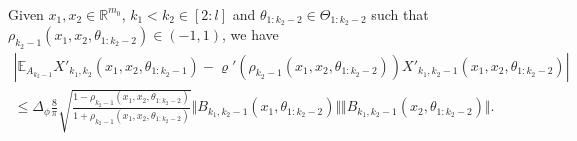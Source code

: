 \documentclass[twoside,11pt]{article}
\newcommand{\R}{\mathbb{R}}
\newcommand{\E}{\mathbb{E}}
\begin{document}
\begin{proposition}\label{prop:bwd_expectation_offdiagonal}~\\
Given $x_1,x_2 \in \R^{m_0}$, $k_1 < k_2 \in [2:l]$ and $\theta_{1:k_2-2} \in \Theta_{1:k_2-2}$ such that $\rho_{k_2-1}(x_1,x_2,\theta_{1:k_2-2}) \in (-1,1)$, we have
\begin{multline*}
\left\vert \E_{A_{k_2-1}} X'_{k_1,k_2}(x_1,x_2,\theta_{1:k_2-1}) - \varrho'(\rho_{k_2-1}(x_1,x_2,\theta_{1:k_2-2})) X'_{k_1,k_2-1}(x_1,x_2,\theta_{1:k_2-2}) \right\vert \\
\leq \Delta_\phi \frac{8}{\pi} \sqrt{\frac{1-\rho_{k_2-1}(x_1,x_2,\theta_{1:k_2-2})}{1+\rho_{k_2-1}(x_1,x_2,\theta_{1:k_2-2})}} \Vert B_{k_1,k_2-1}(x_1,\theta_{1:k_2-2}) \Vert \Vert B_{k_1,k_2-1}(x_2,\theta_{1:k_2-2}) \Vert.
\end{multline*}
\end{proposition}
\end{document}
